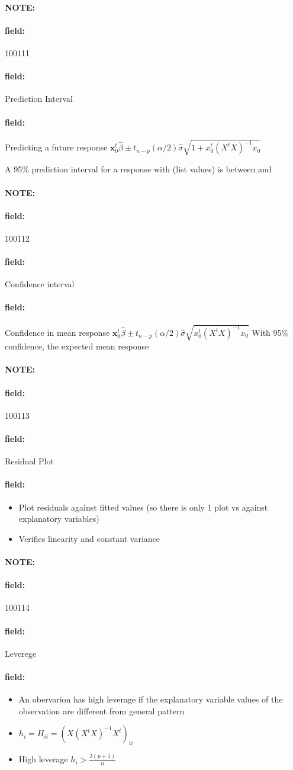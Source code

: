 \documentclass[12pt]{article}
\newenvironment{note}{\paragraph{NOTE:}}{}
\newenvironment{field}{\paragraph{field:}}{}
\begin{document}
\begin{note} \begin{field} \tiny 100111 \end{field}
 \begin{field}
  Prediction Interval
 \end{field}
 \begin{field}
  Predicting a future response
  $\mathbf{x}_0^t \hat{\beta} \pm t_{n-p}(\alpha/2)\hat{\sigma} \sqrt{1 + x_0^t(X^tX)^{-1}x_0}$

  A 95\% prediction interval for a response with (list values) is between and
 \end{field}
\end{note}



\begin{note} \begin{field} \tiny 100112 \end{field}
 \begin{field}
  Confidence interval
 \end{field}
 \begin{field}
  Confidence in mean response $\mathbf{x}_0^t \hat{\beta} \pm t_{n-p}(\alpha/2)\hat{\sigma} \sqrt{x_0^t(X^tX)^{-1}x_0}$
  With 95\% confidence, the expected mean response
 \end{field}
\end{note}


\begin{note} \begin{field} \tiny 100113 \end{field}
 \begin{field}
  Residual Plot
 \end{field}
 \begin{field}
  \begin{itemize}
   \item Plot residuals against fitted values (so there is only 1 plot vs against explanatory variables)
   \item Verifies linearity and constant variance
  \end{itemize}
 \end{field}
\end{note}

\begin{note} \begin{field} \tiny 100114 \end{field}
 \begin{field}
  Leverege
 \end{field}
 \begin{field}
  \begin{itemize}
   \item An obervarion has high leverage if the explanatory variable values of the observation are different from general pattern
   \item $h_i = H_{ii} = (X(X^tX)^{-1}X^t)_{ii}$
   \item High leverage $h_i > \frac{2(p+1)}{n}$
  \end{itemize}
 \end{field}
\end{note}
\end{document}
